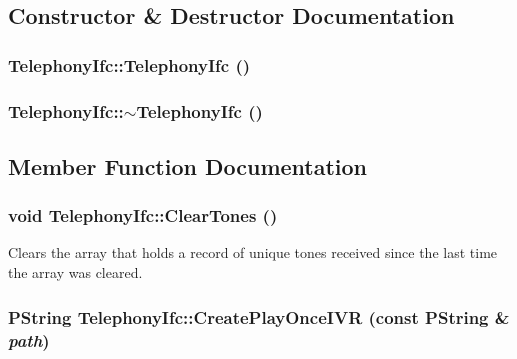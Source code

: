 \subsection{Constructor \& Destructor Documentation}
\hypertarget{classTelephonyIfc_5c7207e37d5e718cf8bc8e855c5e1fd5}{
\subsubsection[{TelephonyIfc}]{\setlength{\rightskip}{0pt plus 5cm}TelephonyIfc::TelephonyIfc ()}}
\label{classTelephonyIfc_5c7207e37d5e718cf8bc8e855c5e1fd5}


\hypertarget{classTelephonyIfc_c8e1d2141874e5aa05c56174605a9e1b}{
\subsubsection[{$\sim$TelephonyIfc}]{\setlength{\rightskip}{0pt plus 5cm}TelephonyIfc::$\sim$TelephonyIfc ()}}
\label{classTelephonyIfc_c8e1d2141874e5aa05c56174605a9e1b}




\subsection{Member Function Documentation}
\hypertarget{classTelephonyIfc_c471d58342002859cc9a59b1d1e494ca}{
\subsubsection[{ClearTones}]{\setlength{\rightskip}{0pt plus 5cm}void TelephonyIfc::ClearTones ()}}
\label{classTelephonyIfc_c471d58342002859cc9a59b1d1e494ca}


Clears the array that holds a record of unique tones received since the last time the array was cleared. 

\hypertarget{classTelephonyIfc_3a36df5d3544c1c2c930a9e912ac19ed}{
\subsubsection[{CreatePlayOnceIVR}]{\setlength{\rightskip}{0pt plus 5cm}PString TelephonyIfc::CreatePlayOnceIVR (const PString \& {\em path})}}
\label{classTelephonyIfc_3a36df5d3544c1c2c930a9e912ac19ed}


